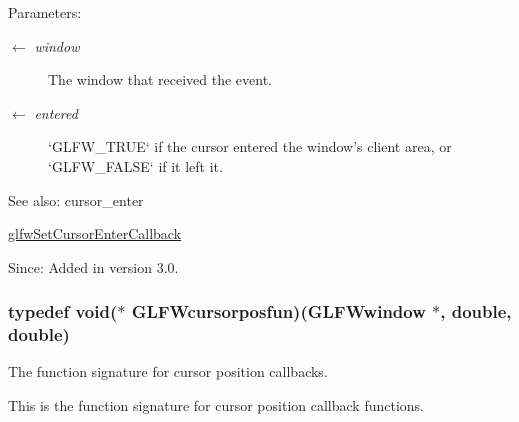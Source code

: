 \begin{Desc}
\item[Parameters:]
\begin{description}
\item[\mbox{$\leftarrow$} {\em window}]The window that received the event. \item[\mbox{$\leftarrow$} {\em entered}]`GLFW\_\-TRUE` if the cursor entered the window's client area, or `GLFW\_\-FALSE` if it left it.\end{description}
\end{Desc}
\begin{Desc}
\item[See also:]cursor\_\-enter 

\hyperlink{group__input_ga20014985561efeb2c53f1956f727830}{glfwSetCursorEnterCallback}\end{Desc}
\begin{Desc}
\item[Since:]Added in version 3.0. \end{Desc}
\hypertarget{group__input_g592fbfef76d88f027cb1bc4c36ebd437}{
\subsubsection[GLFWcursorposfun]{\setlength{\rightskip}{0pt plus 5cm}typedef void($\ast$  {\bf GLFWcursorposfun})({\bf GLFWwindow} $\ast$, double, double)}}
\label{group__input_g592fbfef76d88f027cb1bc4c36ebd437}


The function signature for cursor position callbacks. 

This is the function signature for cursor position callback functions.

